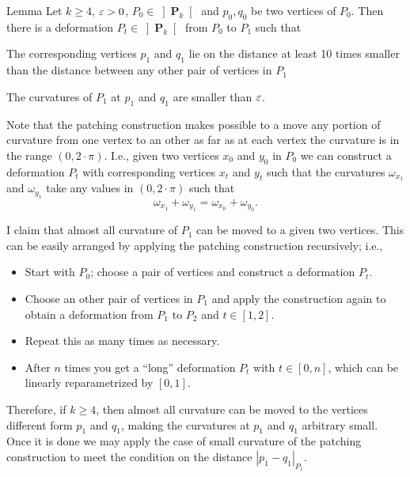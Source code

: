 \begin{thm}{Lemma}\label{lem:k>=4}
Let $k\ge 4$, $\varepsilon>0$,
$P_0\in\left] \mathbf{P}_k\right[$ 
and $p_0,q_0$ be two vertices of $P_0$.
Then there is a deformation $P_t\in\left] \mathbf{P}_{k}\right[$
from $P_0$ to $P_1$ such that 
\begin{subthm}{}
The corresponding vertices $p_1$ and $q_1$ lie on the distance at least 10 times smaller than the distance between any other pair of vertices in $P_1$
\end{subthm}
\begin{subthm}{}
The curvatures of $P_1$ at $p_1$ and $q_1$ are smaller than $\varepsilon$.
\end{subthm}
\end{thm}

 Note that the patching construction makes possible to a move any portion of curvature from one vertex to an other
as far as at each vertex the curvature is in the range $(0,2\cdot\pi)$.
I.e., given two vertices $x_0$ and $y_0$ in $P_0$ we can construct a deformation $P_t$ with corresponding vertices $x_t$ and $y_t$
such that the curvatures $\omega_{x_1}$ and $\omega_{y_1}$ take any values in $(0,2\cdot\pi)$ such that
$$\omega_{x_1}+\omega_{y_1}=\omega_{x_0}+\omega_{y_0}.$$



I claim that almost all curvature of $P_1$ 
can be moved to a given two vertices.
This can be easily arranged by applying the patching construction recursively;
i.e.,
\begin{itemize}
\item Start with $P_0$; 
choose a pair of vertices and construct a deformation $P_t$.
\item Choose an other pair of vertices in $P_1$ and apply the construction again to obtain a deformation from $P_1$ to $P_2$ and $t\in [1,2]$.
\item Repeat this as many times as necessary.
\item After $n$ times you get a ``long'' deformation $P_t$ with $t\in [0,n]$, which can be linearly  reparametrized by $[0,1]$.
\end{itemize}

Therefore, if $k\ge 4$,
then almost all curvature can be moved to the vertices different form $p_1$ and $q_1$,
making the curvatures at $p_1$ and $q_1$ arbitrary small.
Once it is done we may apply the case of small curvature of the patching construction 
to meet the condition on the distance
$|p_1-q_1|_{P_1}$.
\qeds






